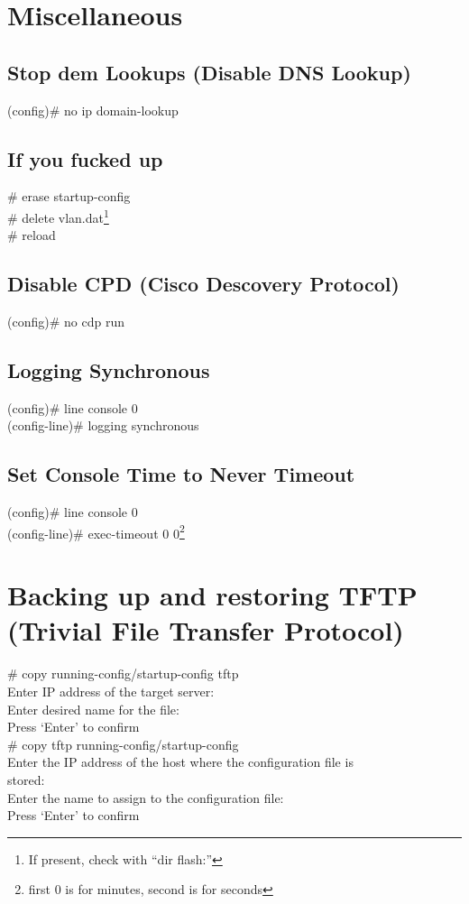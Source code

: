 \section{Miscellaneous}
\subsection{Stop dem Lookups (Disable DNS Lookup)}
(config)\# no ip domain-lookup

\subsection{If you fucked up}
\# erase startup-config \\
\# delete vlan.dat\footnote{If present, check with ``dir flash:''}\\
\# reload

\subsection{Disable CPD (Cisco Descovery Protocol)}
(config)\# no cdp run

\subsection{Logging Synchronous}
(config)\# line console 0 \\
(config-line)\# logging synchronous

\subsection{Set Console Time to Never Timeout}
(config)\# line console 0 \\
(config-line)\# exec-timeout 0 0\footnote{first 0 is for minutes, second is for seconds}

\section{Backing up and restoring TFTP (Trivial File Transfer Protocol)}
\# copy running-config/startup-config tftp\\
Enter IP address of the target server:\\
Enter desired name for the file:\\
Press ‘Enter’ to confirm\vspace{11pt}\\
\# copy tftp running-config/startup-config \\
Enter the IP address of the host where the configuration file is \\stored:\\
Enter the name to assign to the configuration file: \\
Press ‘Enter’ to confirm

